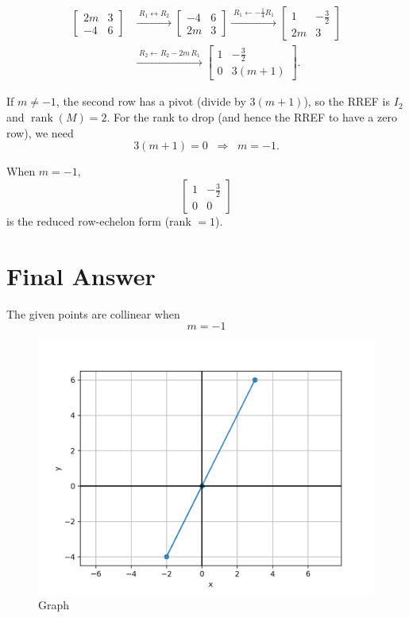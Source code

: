 \documentclass[12pt]{article}
\begin{document}
\[
\begin{aligned}
\begin{bmatrix}
2m & 3\\
-4 & 6
\end{bmatrix}
&\xrightarrow{\;R_1 \leftrightarrow R_2\;}
\begin{bmatrix}
-4 & 6\\
2m & 3
\end{bmatrix}
\xrightarrow{\;R_1\gets -\tfrac14 R_1\;}
\begin{bmatrix}
1 & -\tfrac{3}{2}\\
2m & 3
\end{bmatrix}\\[6pt]
&\xrightarrow{\;R_2\gets R_2-2m\,R_1\;}
\begin{bmatrix}
1 & -\tfrac{3}{2}\\
0 & 3(m+1)
\end{bmatrix}.
\end{aligned}
\]

If \(m\neq -1\), the second row has a pivot (divide by \(3(m+1)\)), so the RREF is \(I_2\) and \(\operatorname{rank}(M)=2\).
For the rank to drop (and hence the RREF to have a zero row), we need
\[
3(m+1)=0 \;\;\Rightarrow\;\; m=-1.
\]

When \(m=-1\),
\[
\begin{bmatrix}
1 & -\tfrac{3}{2}\\
0 & 0
\end{bmatrix}
\]
is the reduced row-echelon form (rank \(=1\)).

\medskip

\section*{Final Answer}
The given points are collinear when
\[
\boxed{m = -1}
\]

\begin{center}
\end{center}

\begin{figure}[h!]
    \centering
    \includegraphics[width=0.65\linewidth]{figs/fig.png}
    \caption{Graph}
\end{figure}
\end{document}
